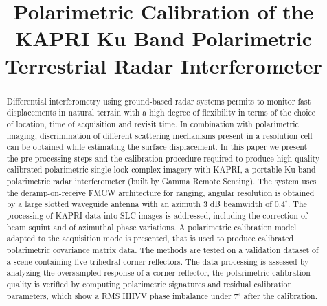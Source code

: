 \documentclass[12pt]{IEEEtran}
\title{Polarimetric Calibration of the KAPRI Ku Band Polarimetric Terrestrial Radar Interferometer}
\author{\IEEEauthorblockN{
	Simone Baffelli,
	Othmar Frey,
	Charles Werner
	Irena Hajnsek
}}
\begin{document}
\maketitle
\begin{abstract}
Differential interferometry using ground-based radar systems permits to monitor fast displacements in natural terrain with a high degree of flexibility in terms of the choice of location, time of acquisition and revisit time. In combination with polarimetric imaging, discrimination of different scattering mechanisms present in a resolution cell can be obtained while estimating the surface displacement.
In this paper we present the pre-processing steps and the calibration procedure required to produce high-quality calibrated polarimetric single-look complex imagery with KAPRI, a portable Ku-band polarimetric radar interferometer (built by Gamma Remote Sensing). The system uses the deramp-on-receive FMCW architecture for ranging, angular resolution is obtained by a large slotted waveguide antenna with an azimuth 3 dB beamwidth of $0.4^\circ$. The processing of KAPRI data into SLC images is addressed, including the correction of beam squint and of azimuthal phase variations. A polarimetric calibration model adapted to the acquisition mode is presented, that is used to produce calibrated polarimetric covariance matrix data. The methods are tested on a validation dataset of a scene containing five trihedral corner reflectors. The data processing is assessed by analyzing the oversampled response of a corner reflector, the polarimetric calibration quality is verified by computing polarimetric signatures and residual calibration parameters, which show a RMS HHVV phase imbalance under $7^\circ$ after the calibration.
\end{abstract}







\end{document}
